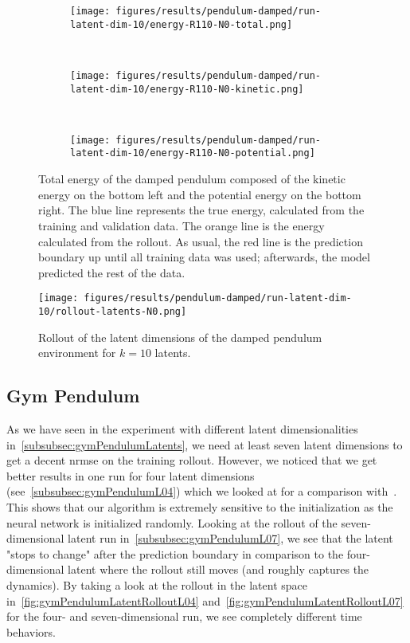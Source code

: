 		\begin{figure}
			\centering
			\begin{subfigure}{0.7\linewidth}
				\texttt{[image: figures/results/pendulum-damped/run-latent-dim-10/energy-R110-N0-total.png]}
			\end{subfigure} \\
			\begin{subfigure}{0.5\linewidth}
				\centering
				\texttt{[image: figures/results/pendulum-damped/run-latent-dim-10/energy-R110-N0-kinetic.png]}
			\end{subfigure}%
			~
			\begin{subfigure}{0.5\linewidth}
				\centering
				\texttt{[image: figures/results/pendulum-damped/run-latent-dim-10/energy-R110-N0-potential.png]}
			\end{subfigure}
			\caption[Total energy of the damped pendulum]{Total energy of the damped pendulum composed of the kinetic energy on the bottom left and the potential energy on the bottom right. The blue line represents the true energy, calculated from the training and validation data. The orange line is the energy calculated from the rollout. As usual, the red line is the prediction boundary up until all training data was used; afterwards, the model predicted the rest of the data.}
			\label{fig:pendulumDampedEnergyL10}
		\end{figure}

		\begin{figure}
			\centering
			\texttt{[image: figures/results/pendulum-damped/run-latent-dim-10/rollout-latents-N0.png]}
			\caption[Latent rollout of the damped pendulum experiment for 10 latent dimensions]{Rollout of the latent dimensions of the damped pendulum environment for \(k = 10 \) latents.}
			\label{fig:pendulumDampedLatentRolloutL10}
		\end{figure}

	\subsection{Gym Pendulum}
		\label{subsec:discussGymPendulum}

		As we have seen in the experiment with different latent dimensionalities in~\autoref{subsubsec:gymPendulumLatents}, we need at least seven latent dimensions to get a decent \ac{nrmse} on the training rollout. However, we noticed that we get better results in one run for four latent dimensions (see~\autoref{subsubsec:gymPendulumL04}) which we looked at for a comparison with~\cite{mortonDeepVariationalKoopman2019a}. This shows that our algorithm is extremely sensitive to the initialization as the neural network is initialized randomly. Looking at the rollout of the seven-dimensional latent run in~\autoref{subsubsec:gymPendulumL07}, we see that the latent "stops to change" after the prediction boundary in comparison to the four-dimensional latent where the rollout still moves (and roughly captures the dynamics). By taking a look at the rollout in the latent space in~\autoref{fig:gymPendulumLatentRolloutL04} and~\autoref{fig:gymPendulumLatentRolloutL07} for the four- and seven-dimensional run, we see completely different time behaviors.

